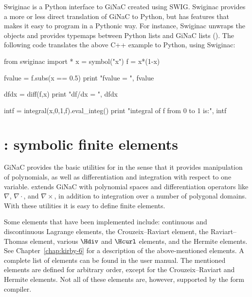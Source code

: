 Swiginac is a Python interface to GiNaC created using SWIG.  Swiginac
provides a more or less direct translation of GiNaC to Python, but has
features that makes it easy to program in a Pythonic way.  For instance,
Swiginac unwraps the  objects and provides typemaps between
Python lists and GiNaC lists ().  The following code translates
the above C++ example to Python, using Swiginac:
\begin{python}
from swiginac import *
x = symbol("x")
f = x*(1-x)

fvalue = f.subs(x == 0.5)
print "fvalue = ", fvalue

dfdx = diff(f,x)
print "df/dx = ", dfdx

intf = integral(x,0,1,f).eval_integ()
print "integral of f from 0 to 1 is:", intf
\end{python}

\section{\syfi{}: symbolic finite elements}

GiNaC provides the basic utilities for \syfi{} in the sense that it provides
manipulation of polynomials, as well as differentiation and integration
with respect to one variable. \syfi{} extends GiNaC with polynomial
spaces and differentiation operators like $\nabla$, $\nabla\cdot$, and
$\nabla\times$, in addition to integration over a number of polygonal
domains.  With these utilities it is easy to define finite elements.

Some elements that have been implemented include: continuous and
discontinuous Lagrange elements, the Crouzeix--Raviart element, the
Raviart--Thomas element, various $\Hdiv$ and $\Hcurl$ \nedelec{} elements, and
the Hermite elements. See Chapter~\ref{chap:kirby-6} for a description of
the above-mentioned elements.  A complete list of elements can be found in
the user manual. The mentioned elements are defined for arbitrary order,
except for the Crouzeix--Raviart and Hermite elements. Not all of these
elements are, however, supported by the form compiler.

